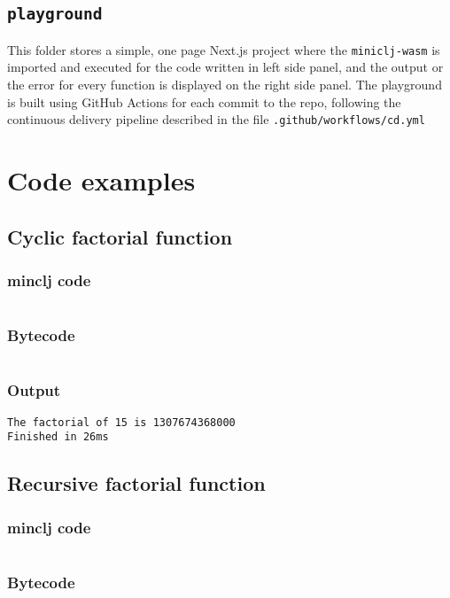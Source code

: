 \documentclass[11pt]{scrreprt}
\begin{document}
\section{\texttt{playground}}
This folder stores a simple, one page Next.js project where the \texttt{miniclj-wasm} is imported and executed for the code written in left side panel, and the output or the error for every function is displayed on the right side panel. The playground is built using GitHub Actions for each commit to the repo, following the continuous delivery pipeline described in the file \texttt{.github/workflows/cd.yml}


\chapter{Code examples}

\section{Cyclic factorial function}
\subsection{minclj code}
\inputminted{clojure}{/home/mario/git/MarioJim/miniclj/examples/cyclic_factorial.clj}

\subsection{Bytecode}
\inputminted{text}{/home/mario/git/MarioJim/miniclj/examples/cyclic_factorial.mclj}

\subsection{Output}
\begin{verbatim}
The factorial of 15 is 1307674368000
Finished in 26ms
\end{verbatim}


\section{Recursive factorial function}
\subsection{minclj code}
\inputminted{clojure}{/home/mario/git/MarioJim/miniclj/examples/recursive_factorial.clj}

\subsection{Bytecode}
\inputminted{text}{/home/mario/git/MarioJim/miniclj/examples/recursive_factorial.mclj}
\end{document}
